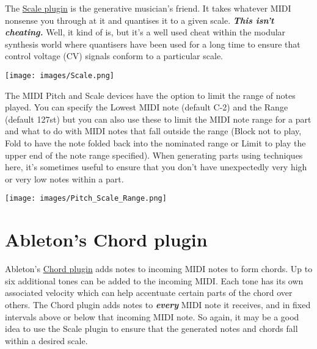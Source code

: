 \documentclass[
  12pt,
  letterpaper,
  oneside,
  open=any]{scrbook}
\begin{document}
The
\href{https://www.ableton.com/en/live-manual/11/live-midi-effect-reference/\#scale}{Scale
plugin} is the generative musician's friend. It takes whatever MIDI
nonsense you through at it and quantises it to a given scale.
\textbf{\emph{This isn't cheating.}} Well, it kind of is, but it's a
well used cheat within the modular synthesis world where quantisers have
been used for a long time to ensure that control voltage (CV) signals
conform to a particular scale.

\texttt{[image: images/Scale.png]}

\begin{tcolorbox}[enhanced jigsaw, colback=white, rightrule=.15mm, toprule=.15mm, arc=.35mm, opacitybacktitle=0.6, coltitle=black, leftrule=.75mm, bottomtitle=1mm, toptitle=1mm, left=2mm, bottomrule=.15mm, titlerule=0mm, colbacktitle=quarto-callout-tip-color!10!white, colframe=quarto-callout-tip-color-frame, title=\textcolor{quarto-callout-tip-color}{\faLightbulb}\hspace{0.5em}{Note Range}, breakable, opacityback=0]

The MIDI Pitch and Scale devices have the option to limit the range of
notes played. You can specify the Lowest MIDI note (default C-2) and the
Range (default 127st) but you can also use these to limit the MIDI note
range for a part and what to do with MIDI notes that fall outside the
range (Block not to play, Fold to have the note folded back into the
nominated range or Limit to play the upper end of the note range
specified). When generating parts using techniques here, it's sometimes
useful to ensure that you don't have unexpectedly very high or very low
notes within a part.

\end{tcolorbox}

\texttt{[image: images/Pitch\_Scale\_Range.png]}

\section{Ableton's Chord plugin}\label{abletons-chord-plugin}

Ableton's
\href{https://www.ableton.com/en/live-manual/11/live-midi-effect-reference/\#chord}{Chord
plugin} adds notes to incoming MIDI notes to form chords. Up to six
additional tones can be added to the incoming MIDI. Each tone has its
own associated velocity which can help accentuate certain parts of the
chord over others. The Chord plugin adds notes to \textbf{\emph{every}}
MIDI note it receives, and in fixed intervals above or below that
incoming MIDI note. So again, it may be a good idea to use the Scale
plugin to ensure that the generated notes and chords fall within a
desired scale.
\end{document}
